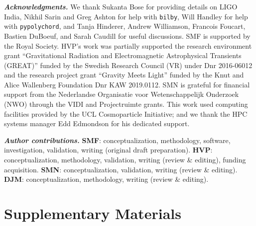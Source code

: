 \documentclass[%
 reprint,
 superscriptaddress,
 nofootinbib,
 amsmath,amssymb,
 aps,
]{revtex4-2}
\begin{document}

\textbf{\emph{Acknowledgments.}} We thank Sukanta Bose for providing details on LIGO India, Nikhil Sarin and Greg Ashton for help with \texttt{bilby}, Will Handley for help with \texttt{pypolychord}, and Tanja Hinderer, Andrew Williamson, Francois Foucart, Bastien DuBoeuf, and Sarah Caudill for useful discussions. SMF is supported by the Royal Society. HVP's work was partially supported the research environment grant ``Gravitational Radiation and Electromagnetic Astrophysical Transients (GREAT)'' funded by the Swedish Research Council (VR) under Dnr 2016-06012 and the research project grant ``Gravity Meets Light'' funded by the Knut and Alice Wallenberg Foundation Dnr KAW 2019.0112. SMN is grateful for financial support from the Nederlandse Organisatie voor Wetenschappelijk Onderzoek (NWO) through the VIDI and Projectruimte grants. This work used computing facilities provided by the UCL Cosmoparticle Initiative; and we thank the HPC systems manager Edd Edmondson for his dedicated support.

\textbf{\emph{Author contributions.}} {\bf SMF}: conceptualization, methodology, software, investigation, validation, writing (original draft preparation). {\bf HVP}: conceptualization, methodology, validation, writing (review \& editing), funding acquisition. {\bf SMN}: conceptualization, validation, writing (review \& editing). {\bf DJM}: conceptualization, methodology, writing (review \& editing).


\appendix

\section{Supplementary Materials}
\end{document}
